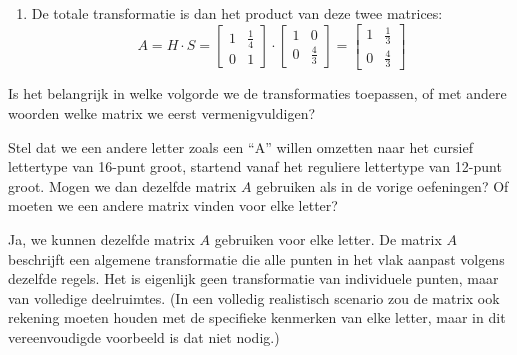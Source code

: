 \documentclass{ximera}
\begin{document}
\begin{exercise}
\begin{oplossing}
\begin{enumerate}
        \item De totale transformatie is dan het product van deze twee matrices:
        \[A = H \cdot S = \begin{bmatrix} 1 & \frac{1}{4} \\ 0 & 1 \end{bmatrix} \cdot \begin{bmatrix} 1 & 0 \\ 0 & \frac{4}{3} \end{bmatrix} = \begin{bmatrix} 1 & \frac{1}{3} \\ 0 & \frac{4}{3} \end{bmatrix}\]
    \end{enumerate}
    Is het belangrijk in welke volgorde we de transformaties toepassen, of met andere woorden welke matrix we eerst vermenigvuldigen?
\end{oplossing}
\end{exercise}

\begin{exercise}
    Stel dat we een andere letter zoals een ``A'' willen omzetten naar het cursief lettertype van 16-punt groot, startend vanaf het reguliere lettertype van 12-punt groot.
    Mogen we dan dezelfde matrix $A$ gebruiken als in de vorige oefeningen?
    Of moeten we een andere matrix vinden voor elke letter?
    \begin{figure}[H]
    \end{figure}
    \begin{oplossing}
    Ja, we kunnen dezelfde matrix $A$ gebruiken voor elke letter.
    De matrix $A$ beschrijft een algemene transformatie die alle punten in het vlak aanpast volgens dezelfde regels.
    Het is eigenlijk geen transformatie van individuele punten, maar van volledige deelruimtes.
    (In een volledig realistisch scenario zou de matrix ook rekening moeten houden met de specifieke kenmerken van elke letter, maar in dit vereenvoudigde voorbeeld is dat niet nodig.)
    \end{oplossing}
    
\end{exercise}
\end{document}
